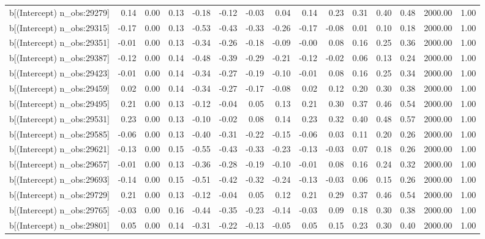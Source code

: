 \begin{table}[ht]
\begin{tabular}{rrrrrrrrrrrrrrr}
  b[(Intercept) n\_obs:29279] & 0.14 & 0.00 & 0.13 & -0.18 & -0.12 & -0.03 & 0.04 & 0.14 & 0.23 & 0.31 & 0.40 & 0.48 & 2000.00 & 1.00 \\ 
  b[(Intercept) n\_obs:29315] & -0.17 & 0.00 & 0.13 & -0.53 & -0.43 & -0.33 & -0.26 & -0.17 & -0.08 & 0.01 & 0.10 & 0.18 & 2000.00 & 1.00 \\ 
  b[(Intercept) n\_obs:29351] & -0.01 & 0.00 & 0.13 & -0.34 & -0.26 & -0.18 & -0.09 & -0.00 & 0.08 & 0.16 & 0.25 & 0.36 & 2000.00 & 1.00 \\ 
  b[(Intercept) n\_obs:29387] & -0.12 & 0.00 & 0.14 & -0.48 & -0.39 & -0.29 & -0.21 & -0.12 & -0.02 & 0.06 & 0.13 & 0.24 & 2000.00 & 1.00 \\ 
  b[(Intercept) n\_obs:29423] & -0.01 & 0.00 & 0.14 & -0.34 & -0.27 & -0.19 & -0.10 & -0.01 & 0.08 & 0.16 & 0.25 & 0.34 & 2000.00 & 1.00 \\ 
  b[(Intercept) n\_obs:29459] & 0.02 & 0.00 & 0.14 & -0.34 & -0.27 & -0.17 & -0.08 & 0.02 & 0.12 & 0.20 & 0.30 & 0.38 & 2000.00 & 1.00 \\ 
  b[(Intercept) n\_obs:29495] & 0.21 & 0.00 & 0.13 & -0.12 & -0.04 & 0.05 & 0.13 & 0.21 & 0.30 & 0.37 & 0.46 & 0.54 & 2000.00 & 1.00 \\ 
  b[(Intercept) n\_obs:29531] & 0.23 & 0.00 & 0.13 & -0.10 & -0.02 & 0.08 & 0.14 & 0.23 & 0.32 & 0.40 & 0.48 & 0.57 & 2000.00 & 1.00 \\ 
  b[(Intercept) n\_obs:29585] & -0.06 & 0.00 & 0.13 & -0.40 & -0.31 & -0.22 & -0.15 & -0.06 & 0.03 & 0.11 & 0.20 & 0.26 & 2000.00 & 1.00 \\ 
  b[(Intercept) n\_obs:29621] & -0.13 & 0.00 & 0.15 & -0.55 & -0.43 & -0.33 & -0.23 & -0.13 & -0.03 & 0.07 & 0.18 & 0.26 & 2000.00 & 1.00 \\ 
  b[(Intercept) n\_obs:29657] & -0.01 & 0.00 & 0.13 & -0.36 & -0.28 & -0.19 & -0.10 & -0.01 & 0.08 & 0.16 & 0.24 & 0.32 & 2000.00 & 1.00 \\ 
  b[(Intercept) n\_obs:29693] & -0.14 & 0.00 & 0.15 & -0.51 & -0.42 & -0.32 & -0.24 & -0.13 & -0.03 & 0.06 & 0.15 & 0.26 & 2000.00 & 1.00 \\ 
  b[(Intercept) n\_obs:29729] & 0.21 & 0.00 & 0.13 & -0.12 & -0.04 & 0.05 & 0.12 & 0.21 & 0.29 & 0.37 & 0.46 & 0.54 & 2000.00 & 1.00 \\ 
  b[(Intercept) n\_obs:29765] & -0.03 & 0.00 & 0.16 & -0.44 & -0.35 & -0.23 & -0.14 & -0.03 & 0.09 & 0.18 & 0.30 & 0.38 & 2000.00 & 1.00 \\ 
  b[(Intercept) n\_obs:29801] & 0.05 & 0.00 & 0.14 & -0.31 & -0.22 & -0.13 & -0.05 & 0.05 & 0.15 & 0.23 & 0.30 & 0.40 & 2000.00 & 1.00 \\ 

\end{tabular}
\end{table}
